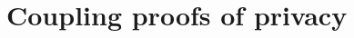 \documentclass{article}
\newtheorem{definition}{Definition}[section]
\renewcommand{\epsilon}{\varepsilon}
\newcommand{\loss}{\textup{loss}}
\newcommand{\1}{\langle 1 \rangle}
\newcommand{\2}{\langle 2 \rangle}
\begin{document}











\section{Coupling proofs of privacy}
\end{document}
